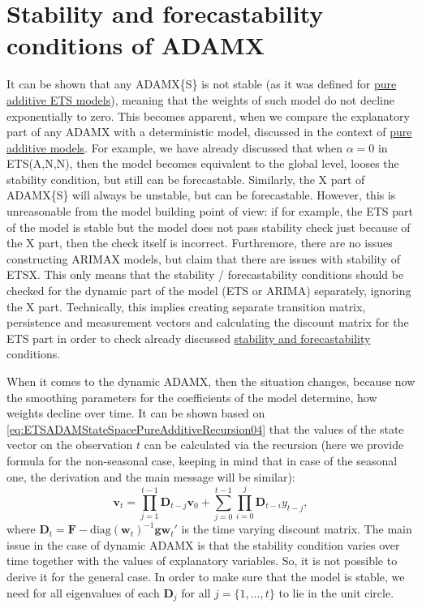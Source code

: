 \documentclass[
]{book}
\theoremstyle{definition}
\theoremstyle{definition}
\theoremstyle{definition}
\theoremstyle{definition}
\theoremstyle{remark}
\begin{document}
\hypertarget{stability-and-forecastability-conditions-of-adamx}{%
\section{Stability and forecastability conditions of ADAMX}\label{stability-and-forecastability-conditions-of-adamx}}

It can be shown that any ADAMX\{S\} is not stable (as it was defined for \protect\hyperlink{stabilityConditionAdditiveError}{pure additive ETS models}), meaning that the weights of such model do not decline exponentially to zero. This becomes apparent, when we compare the explanatory part of any ADAMX with a deterministic model, discussed in the context of \protect\hyperlink{stabilityConditionAdditiveError}{pure additive models}. For example, we have already discussed that when \(\alpha=0\) in ETS(A,N,N), then the model becomes equivalent to the global level, looses the stability condition, but still can be forecastable. Similarly, the X part of ADAMX\{S\} will always be unstable, but can be forecastable. However, this is unreasonable from the model building point of view: if for example, the ETS part of the model is stable but the model does not pass stability check just because of the X part, then the check itself is incorrect. Furthremore, there are no issues constructing ARIMAX models, but \citet{Hyndman2008b} claim that there are issues with stability of ETSX. This only means that the stability / forecastability conditions should be checked for the dynamic part of the model (ETS or ARIMA) separately, ignoring the X part. Technically, this implies creating separate transition matrix, persistence and measurement vectors and calculating the discount matrix for the ETS part in order to check already discussed \protect\hyperlink{stabilityConditionAdditiveError}{stability and forecastability} conditions.

When it comes to the dynamic ADAMX, then the situation changes, because now the smoothing parameters for the coefficients of the model determine, how weights decline over time. It can be shown based on \eqref{eq:ETSADAMStateSpacePureAdditiveRecursion04} that the values of the state vector on the observation \(t\) can be calculated via the recursion (here we provide formula for the non-seasonal case, keeping in mind that in case of the seasonal one, the derivation and the main message will be similar):
\begin{equation}
  \mathbf{v}_{t} = \prod_{j=1}^{t-1}\mathbf{D}_{t-j} \mathbf{v}_{0} + \sum_{j=0}^{t-1} \prod_{i=0}^{j} \mathbf{D}_{t-i} y_{t-j},
  \label{eq:ADAMETSXPureAdditiveDynamicNonSeasonalBackRecursion}
\end{equation}
where \(\mathbf{D}_t=\mathbf{F} - \mathrm{diag}\left(\mathbf{w}_{t}\right)^{-1} \mathbf{g} \mathbf{w}_{t}'\) is the time varying discount matrix. The main issue in the case of dynamic ADAMX is that the stability condition varies over time together with the values of explanatory variables. So, it is not possible to derive it for the general case. In order to make sure that the model is stable, we need for all eigenvalues of each \(\mathbf{D}_{j}\) for all \(j=\{1,\dots,t\}\) to lie in the unit circle.
\end{document}
